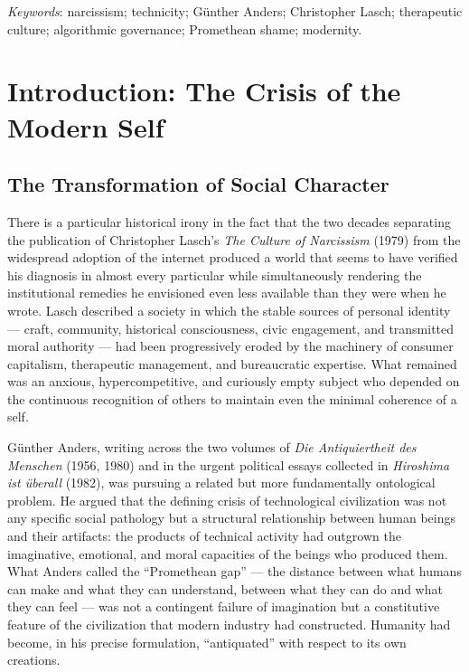 \documentclass[12pt]{memoir}
\begin{document}
\medskip
\noindent\textit{Keywords}: narcissism; technicity; Günther Anders; Christopher Lasch;
therapeutic culture; algorithmic governance; Promethean shame; modernity.

\vspace{1.5em}

\section{Introduction: The Crisis of the Modern Self}

\subsection{The Transformation of Social Character}

There is a particular historical irony in the fact that the two decades separating the
publication of Christopher Lasch's \textit{The Culture of Narcissism} (1979) from the
widespread adoption of the internet produced a world that seems to have verified his diagnosis
in almost every particular while simultaneously rendering the institutional remedies he
envisioned even less available than they were when he wrote. Lasch described a society in which
the stable sources of personal identity — craft, community, historical consciousness, civic
engagement, and transmitted moral authority — had been progressively eroded by the machinery
of consumer capitalism, therapeutic management, and bureaucratic expertise. What remained was
an anxious, hypercompetitive, and curiously empty subject who depended on the continuous
recognition of others to maintain even the minimal coherence of a self.

Günther Anders, writing across the two volumes of \textit{Die Antiquiertheit des Menschen}
(1956, 1980) and in the urgent political essays collected in \textit{Hiroshima ist überall}
(1982), was pursuing a related but more fundamentally ontological problem. He argued that the
defining crisis of technological civilization was not any specific social pathology but a
structural relationship between human beings and their artifacts: the products of technical
activity had outgrown the imaginative, emotional, and moral capacities of the beings who
produced them. What Anders called the \enquote{Promethean gap} — the distance between what
humans can make and what they can understand, between what they can do and what they can feel —
was not a contingent failure of imagination but a constitutive feature of the civilization that
modern industry had constructed. Humanity had become, in his precise formulation,
\enquote{antiquated} with respect to its own creations.
\end{document}
